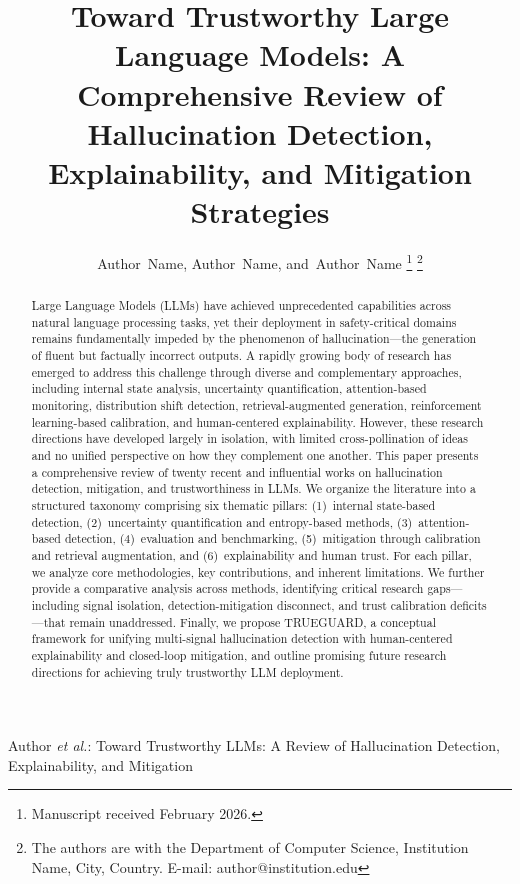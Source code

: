 \documentclass[journal]{IEEEtran}
\begin{document}
\title{Toward Trustworthy Large Language Models: A Comprehensive Review of Hallucination Detection, Explainability, and Mitigation Strategies}

\author{Author~Name,
        Author~Name,
        and~Author~Name%
\thanks{Manuscript received February 2026.}%
\thanks{The authors are with the Department of Computer Science, Institution Name, City, Country. E-mail: author@institution.edu}}

%
{Author \MakeLowercase{\textit{et al.}}: Toward Trustworthy LLMs: A Review of Hallucination Detection, Explainability, and Mitigation}

\maketitle

\begin{abstract}
Large Language Models (LLMs) have achieved unprecedented capabilities across natural language processing tasks, yet their deployment in safety-critical domains remains fundamentally impeded by the phenomenon of hallucination---the generation of fluent but factually incorrect outputs. A rapidly growing body of research has emerged to address this challenge through diverse and complementary approaches, including internal state analysis, uncertainty quantification, attention-based monitoring, distribution shift detection, retrieval-augmented generation, reinforcement learning-based calibration, and human-centered explainability. However, these research directions have developed largely in isolation, with limited cross-pollination of ideas and no unified perspective on how they complement one another. This paper presents a comprehensive review of twenty recent and influential works on hallucination detection, mitigation, and trustworthiness in LLMs. We organize the literature into a structured taxonomy comprising six thematic pillars: (1)~internal state-based detection, (2)~uncertainty quantification and entropy-based methods, (3)~attention-based detection, (4)~evaluation and benchmarking, (5)~mitigation through calibration and retrieval augmentation, and (6)~explainability and human trust. For each pillar, we analyze core methodologies, key contributions, and inherent limitations. We further provide a comparative analysis across methods, identifying critical research gaps---including signal isolation, detection-mitigation disconnect, and trust calibration deficits---that remain unaddressed. Finally, we propose TRUEGUARD, a conceptual framework for unifying multi-signal hallucination detection with human-centered explainability and closed-loop mitigation, and outline promising future research directions for achieving truly trustworthy LLM deployment.
\end{abstract}
 
\end{document}
